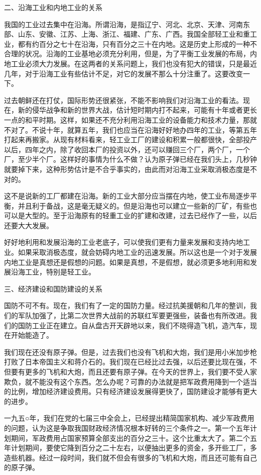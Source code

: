 \documentclass[UTF8, 12pt, a4paper]{ctexrep}
\begin{document}
二、沿海工业和内地工业的关系

我国的工业过去集中在沿海。所谓沿海，是指辽宁、河北、北京、天津、河南东部、山东、安徽、江苏、上海、浙江、福建、广东、广西。我国全部轻工业和重工业，都有约百分之七十在沿海，只有百分之三十在内地。这是历史上形成的一种不合理的状况。沿海的工业基地必须充分利用，但是，为了平衡工业发展的布局，内地工业必须大力发展。在这两者的关系问题上，我们也没有犯大的错误，只是最近几年，对于沿海工业有些估计不足，对它的发展不那么十分注重了。这要改变一下。

过去朝鲜还在打仗，国际形势还很紧张，不能不影响我们对沿海工业的看法。现在，新的侵华战争和新的世界大战，估计短时期内打不起来，可能有十年或者更长一点的和平时期。这样，如果还不充分利用沿海工业的设备能力和技术力量，那就不对了。不说十年，就算五年，我们也应当在沿海好好地办四年的工业，等第五年打起来再搬家。从现有材料看来，轻工业工厂的建设和积累一般都很快，全部投产以后，四年之内，除了收回本厂的投资以外，还可以赚回三个厂，两个厂，一个厂，至少半个厂。这样好的事情为什么不做？认为原子弹已经在我们头上，几秒钟就要掉下来，这种形势估计是不合乎事实的，由此而对沿海工业采取消极态度是不对的。

这不是说新的工厂都建在沿海。新的工业大部分应当摆在内地，使工业布局逐步平衡，并且利于备战，这是毫无疑义的。但是沿海也可以建立一些新的厂矿，有些也可以是大型的。至于沿海原有的轻重工业的扩建和改建，过去已经作了一些，以后还要大大发展。

好好地利用和发展沿海的工业老底子，可以使我们更有力量来发展和支持内地工业。如果采取消极态度，就会妨碍内地工业的迅速发展。所以这也是一个对于发展内地工业是真想还是假想的问题。如果是真想，不是假想，就必须更多地利用和发展沿海工业，特别是轻工业。

三、经济建设和国防建设的关系

国防不可不有。现在，我们有了一定的国防力量。经过抗美援朝和几年的整训，我们的军队加强了，比第二次世界大战前的苏联红军要更强些，装备也有所改进。我们的国防工业正在建立。自从盘古开天辟地以来，我们不晓得造飞机，造汽车，现在开始能造了。

我们现在还没有原子弹。但是，过去我们也没有飞机和大炮，我们是用小米加步枪打败了日本帝国主义和蒋介石的。我们现在已经比过去强，以后还要比现在强，不但要有更多的飞机和大炮，而且还要有原子弹。在今天的世界上，我们要不受人家欺负，就不能没有这个东西。怎么办呢？可靠的办法就是把军政费用降到一个适当的比例，增加经济建设费用。只有经济建设发展得更快了，国防建设才能够有更大的进步。

一九五○年，我们在党的七届三中全会上，已经提出精简国家机构、减少军政费用的问题，认为这是争取我国财政经济情况根本好转的三个条件之一。第一个五年计划期间，军政费用占国家预算全部支出的百分之三十。这个比重太大了。第二个五年计划期间，要使它降到百分之二十左右，以便抽出更多的资金，多开些工厂，多造些机器。经过一段时间，我们就不但会有很多的飞机和大炮，而且还可能有自己的原子弹。
\end{document}
